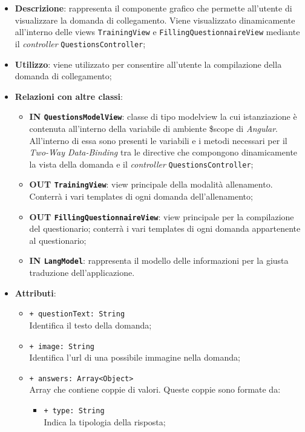 		\begin{itemize}
			\item \textbf{Descrizione}: rappresenta il componente grafico che permette all'utente di visualizzare la domanda di collegamento. Viene visualizzato dinamicamente all'interno delle views \texttt{TrainingView} e \texttt{FillingQuestionnaireView} mediante il \textit{controller} \texttt{QuestionsController};
			\item \textbf{Utilizzo}: viene utilizzato per consentire all'utente la compilazione della domanda di collegamento;
			\item \textbf{Relazioni con altre classi}: 
			\begin{itemize}
				\item \textbf{IN \texttt{QuestionsModelView}}: classe di tipo modelview la cui istanziazione è contenuta all'interno della variabile di ambiente \$scope di \textit{Angular}. All'interno di essa sono presenti le variabili e i metodi necessari per il \textit{Two-Way Data-Binding} tra le directive che compongono dinamicamente la vista della domanda e il \textit{controller} \texttt{QuestionsController};
				\item \textbf{OUT \texttt{TrainingView}}: view principale della modalità allenamento. Conterrà i vari templates di ogni domanda dell'allenamento;
				\item \textbf{OUT \texttt{FillingQuestionnaireView}}: view principale per la compilazione del questionario; conterrà i vari templates di ogni domanda appartenente al questionario;   
				\item \textbf{IN \texttt{LangModel}}: rappresenta il modello delle informazioni per la giusta traduzione dell'applicazione.
			\end{itemize}
			\item \textbf{Attributi}:
			\begin{itemize}
				\item \texttt{+ questionText: String} \\ Identifica il testo della domanda;
				\item \texttt{+ image: String} \\ Identifica l'url di una possibile immagine nella domanda;
				\item \texttt{+ answers: Array<Object>} \\ Array che contiene coppie di valori. Queste coppie sono formate da:
				\begin{itemize}
					\item \texttt{+ type: String} \\ Indica la tipologia della risposta;

\end{itemize}
\end{itemize}
\end{itemize}

